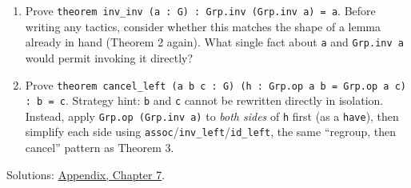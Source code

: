\begin{enumerate}
\item
  Prove \texttt{theorem inv\_\allowbreak{}inv (a : G) : Grp.inv (Grp.inv a) = a}. Before writing any tactics, consider whether this matches the shape of a lemma already in hand (Theorem 2 again). What single fact about \texttt{a} and \texttt{Grp.inv a} would permit invoking it directly?
\item
  Prove \texttt{theorem cancel\_\allowbreak{}left (a b c : G) (h : Grp.op a b = Grp.op a c) : b = c}. Strategy hint: \texttt{b} and \texttt{c} cannot be rewritten directly in isolation. Instead, apply \texttt{Grp.op (Grp.inv a)} to \emph{both sides} of \texttt{h} first (as a \texttt{have}), then simplify each side using \texttt{assoc}/\texttt{inv\_\allowbreak{}left}/\texttt{id\_\allowbreak{}left}, the same ``regroup, then cancel'' pattern as Theorem 3.
\end{enumerate}

Solutions: \hyperref[sec:14-appendix-solutions:06-chapter-7:1]{Appendix, Chapter 7}.

